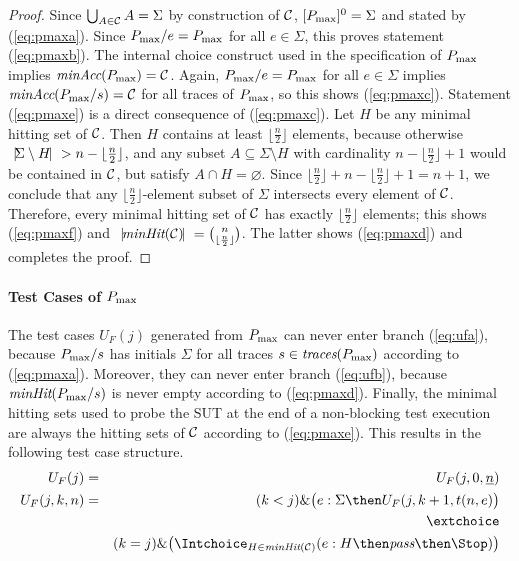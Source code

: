 \begin{proof}
Since $\bigcup_{A\in{\cal C}} A = \Sigma $ by construction of ${\cal C}$,
$[P_\text{max}]^0 = \Sigma$ and stated by (\ref{eq:pmaxa}). Since $P_\text{max}/e = P_\text{max}$
for all $e\in\Sigma$, this proves statement (\ref{eq:pmaxb}). The internal
choice construct used in the specification of $P_\text{max}$ implies
$\text{\it minAcc}(P_\text{max}) = {\cal C}$. Again, $P_\text{max}/e = P_\text{max}$ for all $e\in\Sigma$
implies $\text{\it minAcc}(P_\text{max}/s) = {\cal C}$ for all traces of $P_\text{max}$, so this
shows (\ref{eq:pmaxc}). Statement (\ref{eq:pmaxe}) is a direct consequence of
(\ref{eq:pmaxc}). Let $H$ be any minimal hitting set of ${\cal C}$. Then $H$
contains at least $\lfloor{\frac{n}{2}}\rfloor$ elements, because otherwise
${~|\! \Sigma\setminus H\!|~} > n-\lfloor{\frac{n}{2}}\rfloor$, and any subset
$A\subseteq \Sigma\setminus H$ with cardinality
$n-\lfloor{\frac{n}{2}}\rfloor+1$  would be contained in ${\cal C}$, but
satisfy $A\cap H=\varnothing$. Since
$\lfloor{\frac{n}{2}}\rfloor+n-\lfloor{\frac{n}{2}}\rfloor+1=n+1$, we
conclude that any $\lfloor{\frac{n}{2}}\rfloor$-element subset of $\Sigma$
intersects  every element of ${\cal C}$.  Therefore, every minimal hitting
set of ${\cal C}$ has exactly $\lfloor{\frac{n}{2}}\rfloor$ elements; this
shows (\ref{eq:pmaxf}) and ${~|\! \text{\it minHit}({\cal C})\!|~} =
\binom{n}{\lfloor{\frac{n}{2}}\rfloor}$. The latter shows  (\ref{eq:pmaxd})
and completes the proof. \xbox
\end{proof}

\paragraph{Test Cases of $P_\text{max}$} The test cases $U_F(j)$ generated from $P_\text{max}$ can
never enter branch (\ref{eq:ufa}), because $P_\text{max}/s$ has initials $\Sigma$
for all traces $s\in\text{\it traces}(P_\text{max})$ according to (\ref{eq:pmaxa}). Moreover,
they can never enter branch (\ref{eq:ufb}), because $\text{\it minHit}(P_\text{max}/s)$ is
never empty according to (\ref{eq:pmaxd}). Finally, the minimal hitting sets
used to probe the SUT at the end of a non-blocking test execution are always
the hitting sets of ${\cal C}$ according to (\ref{eq:pmaxe}). This results in
the following test case structure.
\begin{eqnarray*}
\label{eq:UFPpmax}
U_F(j) & = & U_F(j,0,\ii n)
\\
U_F(j,k,n) & = &   (k < j) \& \big(e:\Sigma   \then U_F(j,k+1,t(n,e) \big)
\\ & & \extchoice
\\ & & (k = j) \& \big( \Intchoice_{H\in\minhits({\cal C})} (e:H   \then \epass \then\Stop   )  \big)
\end{eqnarray*}

